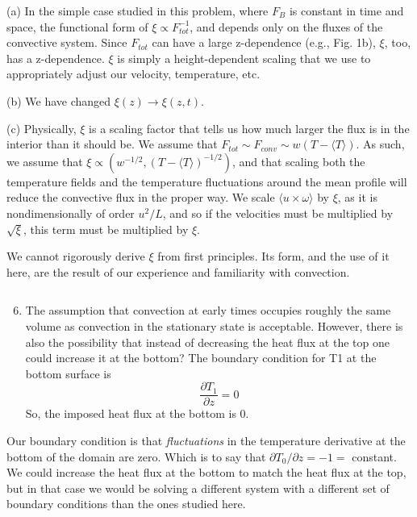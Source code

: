 \documentclass[aps, 11pt, singlecolumn]{revtex4-1} %
\begin{document}
\begin{singlespace}
(a) In the simple case studied in this problem, where $F_B$ is constant in time
and space, the functional form of $\xi \propto F_{tot}^{-1}$, and depends only
on the fluxes of the convective system. Since $F_{tot}$ can
have a large z-dependence (e.g., Fig. 1b), $\xi$, too, has a z-dependence. 
$\xi$ is simply a height-dependent scaling that we use to appropriately
adjust our velocity, temperature, etc.

(b) We have changed $\xi(z) \rightarrow \xi(z, t)$.

(c) Physically, $\xi$ is a scaling factor that tells us how much larger the flux
is in the interior than it should be. 
We assume that $F_{tot} \sim F_{conv} \sim w (T - \langle T \rangle )$.
As such, we assume that $\xi \propto (w^{-1/2}, (T - \langle T \rangle )^{-1/2})$,
and that scaling both the temperature fields and the temperature fluctuations 
around the mean profile will reduce the convective flux in the proper way.
We scale $\langle u\times \omega\rangle$ by $\xi$, as it is
nondimensionally of order $u^2 / L$, and so if the velocities must be multiplied
by $\sqrt{\xi}$, this term must be multiplied by $\xi$.

We cannot rigorously derive $\xi$ from first principles. Its form, and the use of
it here, are the result of our experience and familiarity with convection. 

\begin{myquotation}
$\,$\\\vspace{-1.25cm}
\begin{enumerate}
\setcounter{enumi}{5}
\item The assumption that convection at early times occupies roughly the same volume as convection in the stationary state is acceptable. However, there is also the possibility that instead of decreasing the heat flux at the top one could increase it at the bottom? The boundary condition for T1 at the bottom surface is
$$
\frac{\partial T_1}{\partial z} = 0
$$
So, the imposed heat flux at the bottom is 0.
\end{enumerate}
\end{myquotation}
Our boundary condition is that \emph{fluctuations} in the temperature derivative at the
bottom of the domain are zero. Which is to say that 
$\partial T_0 / \partial z = -1 =$ constant. We could increase the heat flux at
the bottom to match the heat flux at the top, but in that case we would be solving
a different system with a different set of boundary conditions than the ones
studied here. 


\end{singlespace}
\end{document}
